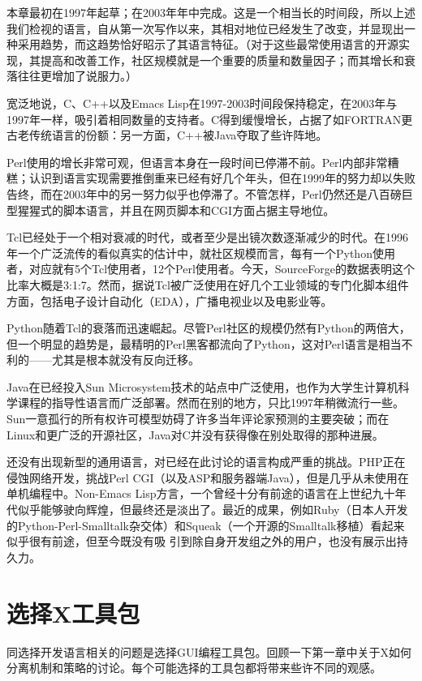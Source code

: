 \documentclass[12pt,oneside]{ctexbook}
\begin{document}
\begin{common-format}
本章最初在1997年起草；在2003年年中完成。这是一个相当长的时间段，所以上述我们检视的语言，自从第一次写作以来，其相对地位已经发生了改变，并显现出一种采用趋势，而这趋势恰好昭示了其语言特征。（对于这些最常使用语言的开源实现，其提高和改善工作，社区规模就是一个重要的质量和数量因子；而其增长和衰落往往更增加了说服力。）

宽泛地说，C、C++以及Emacs Lisp在1997-2003时间段保持稳定，在2003年与1997年一样，吸引着相同数量的支持者。C得到缓慢增长，占据了如FORTRAN更古老传统语言的份额：另一方面，C++被Java夺取了些许阵地。

Perl使用的增长非常可观，但语言本身在一段时间已停滞不前。Perl内部非常糟糕；认识到语言实现需要推倒重来已经有好几个年头，但在1999年的努力却以失败告终，而在2003年中的另一努力似乎也停滞了。不管怎样，Perl仍然还是八百磅巨型猩猩式的脚本语言，并且在网页脚本和CGI方面占据主导地位。

Tcl已经处于一个相对衰减的时代，或者至少是出镜次数逐渐减少的时代。在1996年一个广泛流传的看似真实的估计中，就社区规模而言，每有一个Python使用者，对应就有5个Tcl使用者，12个Perl使用者。今天，SourceForge的数据表明这个比率大概是3:1:7。然而，据说Tcl被广泛使用在好几个工业领域的专门化脚本组件方面，包括电子设计自动化（EDA），广播电视业以及电影业等。

Python随着Tcl的衰落而迅速崛起。尽管Perl社区的规模仍然有Python的两倍大，但一个明显的趋势是，最精明的Perl黑客都流向了Python，这对Perl语言是相当不利的——尤其是根本就没有反向迁移。

Java在已经投入Sun Microsystem技术的站点中广泛使用，也作为大学生计算机科学课程的指导性语言而广泛部署。然而在别的地方，只比1997年稍微流行一些。Sun一意孤行的所有权许可模型妨碍了许多当年评论家预测的主要突破；而在Linux和更广泛的开源社区，Java对C并没有获得像在别处取得的那种进展。

还没有出现新型的通用语言，对已经在此讨论的语言构成严重的挑战。PHP正在侵蚀网络开发，挑战Perl CGI（以及ASP和服务器端Java），但是几乎从未使用在单机编程中。Non-Emacs Lisp方言，一个曾经十分有前途的语言在上世纪九十年代似乎能够驶向辉煌，但最终还是淡出了。最近的成果，例如Ruby（日本人开发的Python-Perl-Smalltalk杂交体）和Squeak（一个开源的Smalltalk移植）看起来似乎很有前途，但至今既没有吸
引到除自身开发组之外的用户，也没有展示出持久力。


\section{选择X工具包}
同选择开发语言相关的问题是选择GUI编程工具包。回顾一下第一章中关于X如何分离机制和策略的讨论。每个可能选择的工具包都将带来些许不同的观感。


\end{common-format}
\end{document}

